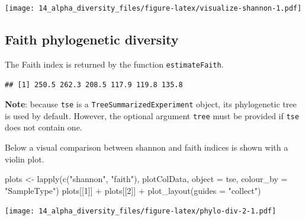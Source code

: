\documentclass[
]{book}
\newenvironment{Shaded}{\begin{snugshade}}{\end{snugshade}}
\newcommand{\AttributeTok}[1]{\textcolor[rgb]{0.77,0.63,0.00}{#1}}
\newcommand{\DecValTok}[1]{\textcolor[rgb]{0.00,0.00,0.81}{#1}}
\newcommand{\FunctionTok}[1]{\textcolor[rgb]{0.00,0.00,0.00}{#1}}
\newcommand{\NormalTok}[1]{#1}
\newcommand{\OtherTok}[1]{\textcolor[rgb]{0.56,0.35,0.01}{#1}}
\newcommand{\SpecialCharTok}[1]{\textcolor[rgb]{0.00,0.00,0.00}{#1}}
\newcommand{\StringTok}[1]{\textcolor[rgb]{0.31,0.60,0.02}{#1}}
\begin{document}
\texttt{[image: 14\_alpha\_diversity\_files/figure-latex/visualize-shannon-1.pdf]}

\hypertarget{faith-diversity}{%
\subsection{Faith phylogenetic diversity}\label{faith-diversity}}

The Faith index is returned by the function \texttt{estimateFaith}.

\begin{Shaded}
\end{Shaded}

\begin{verbatim}
## [1] 250.5 262.3 208.5 117.9 119.8 135.8
\end{verbatim}

\textbf{Note}: because \texttt{tse} is a \texttt{TreeSummarizedExperiment} object, its phylogenetic tree is used by default. However, the optional argument \texttt{tree} must be provided if \texttt{tse} does not contain one.

Below a visual comparison between shannon and faith indices is shown with a violin plot.

\begin{Shaded}
\begin{Highlighting}[]
\NormalTok{plots }\OtherTok{\textless{}{-}} \FunctionTok{lapply}\NormalTok{(}\FunctionTok{c}\NormalTok{(}\StringTok{"shannon"}\NormalTok{, }\StringTok{"faith"}\NormalTok{),}
\NormalTok{                plotColData,}
                \AttributeTok{object =}\NormalTok{ tse, }\AttributeTok{colour\_by =} \StringTok{"SampleType"}\NormalTok{)}
\NormalTok{plots[[}\DecValTok{1}\NormalTok{]] }\SpecialCharTok{+}\NormalTok{ plots[[}\DecValTok{2}\NormalTok{]] }\SpecialCharTok{+}
  \FunctionTok{plot\_layout}\NormalTok{(}\AttributeTok{guides =} \StringTok{"collect"}\NormalTok{)}
\end{Highlighting}
\end{Shaded}

\texttt{[image: 14\_alpha\_diversity\_files/figure-latex/phylo-div-2-1.pdf]}
\end{document}

